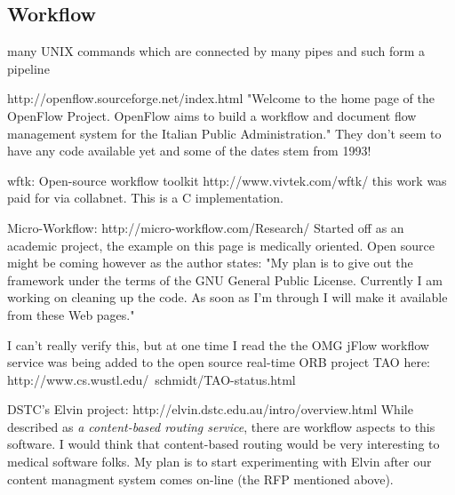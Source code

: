 %
%
%
%
%
%
%

\subsection{Workflow}
\label{workflow_heading}



many UNIX commands which are connected by many pipes and such form a pipeline

http://openflow.sourceforge.net/index.html
"Welcome to the home page of the OpenFlow Project. OpenFlow aims to
build a workflow and document flow management system for the Italian
Public Administration."
They don't seem to have any code available yet and some of the dates
stem from 1993!

wftk: Open-source workflow toolkit http://www.vivtek.com/wftk/
this work was paid for via collabnet.  This is a C implementation.

Micro-Workflow: http://micro-workflow.com/Research/  Started off as an
academic project, the example on this page is medically oriented.  Open
source might be coming however as the author states: "My plan is to give
out the framework under the terms of the GNU General Public License.
Currently I am working on cleaning up the code. As soon as I'm through I
will make it available from these Web pages."

I can't really verify this, but at one time I read the the OMG jFlow
workflow service was being added to  the open source real-time ORB
project TAO here:
http://www.cs.wustl.edu/~schmidt/TAO-status.html

DSTC's Elvin project: http://elvin.dstc.edu.au/intro/overview.html
While described as \textit{a content-based routing service}, there are workflow
aspects to this software.  I would think that content-based routing
would be very interesting to medical software folks.  My plan is to
start experimenting with Elvin after our content managment system comes
on-line (the RFP mentioned above).

